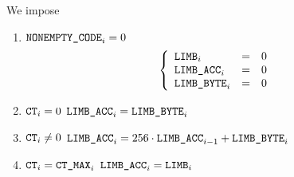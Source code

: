 We impose
\begin{enumerate}
    \item \If $\texttt{NONEMPTY\_CODE} _{i} = 0$ \Then
	\[
	    \left\{ \begin{array}{lcl}
		\texttt{LIMB}     _{i} & = & 0 \\
		\texttt{LIMB\_ACC}  _{i} & = & 0 \\
		\texttt{LIMB\_BYTE} _{i} & = & 0 \\
	    \end{array} \right.
	\]
    \item \If $\texttt{CT} _{i} =    0$           \Then $\texttt{LIMB\_ACC} _{i} = \texttt{LIMB\_BYTE} _{i}$
    \item \If $\texttt{CT} _{i} \neq 0$           \Then $\texttt{LIMB\_ACC} _{i} = 256 \cdot \texttt{LIMB\_ACC} _{i - 1} + \texttt{LIMB\_BYTE} _{i}$
    \item \If $\texttt{CT} _{i} =    \texttt{CT\_MAX} _{i}$ \Then $\texttt{LIMB\_ACC} _{i} = \texttt{LIMB} _{i}$
\end{enumerate}

